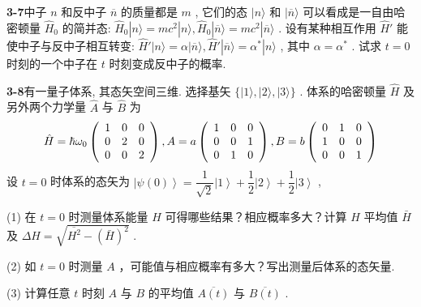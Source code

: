 \newpage

\textbf{3-7}\quad 中子 $\displaystyle n$ 和反中子 $\displaystyle \overline{n}$ 的质量都是 $\displaystyle m$ , 它们的态 $\displaystyle |n\rangle$ 和 $\displaystyle |\overline{n}\rangle$ 可以看成是一自由哈密顿量 $\displaystyle \hat{H}_0$ 的简并态: $\displaystyle \hat{H}_0 |n\rangle = mc^2 |n\rangle, \hat{H}_0 |\overline{n}\rangle = mc^2 |\overline{n}\rangle$ . 设有某种相互作用 $\displaystyle \hat{H}'$ 能使中子与反中子相互转变: $\displaystyle \hat{H}' |n\rangle = \alpha |\overline{n}\rangle, \hat{H}' |\overline{n}\rangle = \alpha^* |n\rangle$ , 其中 $\displaystyle \alpha = \alpha^*$ . 试求 $\displaystyle t = 0$ 时刻的一个中子在 $\displaystyle t$ 时刻变成反中子的概率.

\vfill

\newpage

\textbf{3-8}\quad 有一量子体系, 其态矢空间三维. 选择基矢 $\displaystyle \{|1\rangle, |2\rangle, |3\rangle\}$ . 体系的哈密顿量 $\displaystyle \hat{H}$ 及另外两个力学量 $\displaystyle \hat{A}$ 与 $\displaystyle \hat{B}$ 为
$$
\hat {H} = \hbar \omega_ {0} \left( \begin{array}{c c c} 1 & 0 & 0 \\ 0 & 2 & 0 \\ 0 & 0 & 2 \end{array} \right), A = a \left( \begin{array}{c c c} 1 & 0 & 0 \\ 0 & 0 & 1 \\ 0 & 1 & 0 \end{array} \right), B = b \left( \begin{array}{c c c} 0 & 1 & 0 \\ 1 & 0 & 0 \\ 0 & 0 & 1 \end{array} \right)
$$
设 $\displaystyle t = 0$ 时体系的态矢为 $\displaystyle \left|\psi(0)\right\rangle = \dfrac{1}{\sqrt{2}}\left|1\right\rangle + \dfrac{1}{2}\left|2\right\rangle + \dfrac{1}{2}\left|3\right\rangle$ ,

(1) 在 $\displaystyle t = 0$ 时测量体系能量 $\displaystyle H$ 可得哪些结果？相应概率多大？计算 $\displaystyle H$ 平均值 $\displaystyle \bar{H}$ 及 $\displaystyle \Delta H = \sqrt{\overline{H^2} - (\bar{H})^2}$ .

(2) 如 $\displaystyle t = 0$ 时测量 $\displaystyle A$ ，可能值与相应概率有多大？写出测量后体系的态矢量.

(3) 计算任意 $\displaystyle t$ 时刻 $\displaystyle A$ 与 $\displaystyle B$ 的平均值 $\displaystyle \overline{A(t)}$ 与 $\displaystyle \overline{B(t)}$ .


